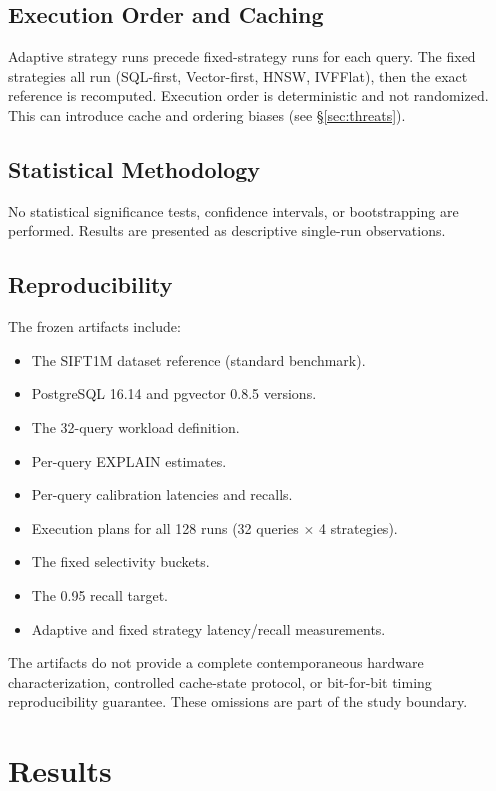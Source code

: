 \documentclass[10pt,twocolumn]{article}
\begin{document}
\subsection{Execution Order and Caching}

Adaptive strategy runs precede fixed-strategy runs for each query. The fixed strategies all run (SQL-first, Vector-first, HNSW, IVFFlat), then the exact reference is recomputed. Execution order is deterministic and not randomized. This can introduce cache and ordering biases (see \S\ref{sec:threats}).

\subsection{Statistical Methodology}

No statistical significance tests, confidence intervals, or bootstrapping are performed. Results are presented as descriptive single-run observations.

\subsection{Reproducibility}

The frozen artifacts include:
\begin{itemize}
\item The SIFT1M dataset reference (standard benchmark).
\item PostgreSQL 16.14 and pgvector 0.8.5 versions.
\item The 32-query workload definition.
\item Per-query EXPLAIN estimates.
\item Per-query calibration latencies and recalls.
\item Execution plans for all 128 runs (32 queries $\times$ 4 strategies).
\item The fixed selectivity buckets.
\item The 0.95 recall target.
\item Adaptive and fixed strategy latency/recall measurements.
\end{itemize}

The artifacts do not provide a complete contemporaneous hardware characterization, controlled cache-state protocol, or bit-for-bit timing reproducibility guarantee. These omissions are part of the study boundary.

\section{Results}
\label{sec:results}
\end{document}
